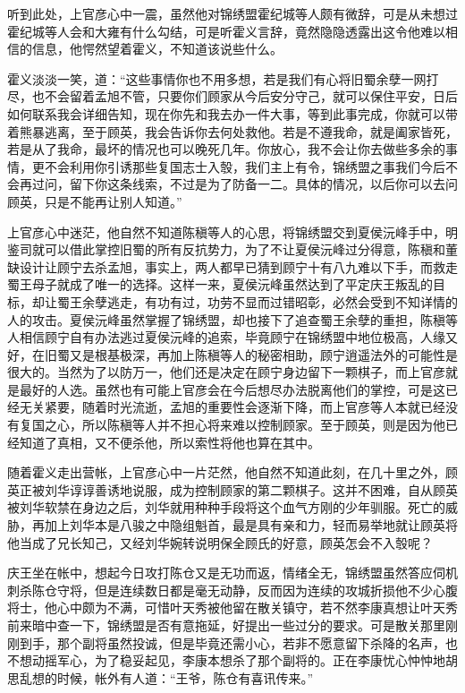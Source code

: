 听到此处，上官彦心中一震，虽然他对锦绣盟霍纪城等人颇有微辞，可是从未想过霍纪城等人会和大雍有什么勾结，可是听霍义言辞，竟然隐隐透露出这令他难以相信的信息，他愕然望着霍义，不知道该说些什么。

霍义淡淡一笑，道：“这些事情你也不用多想，若是我们有心将旧蜀余孽一网打尽，也不会留着孟旭不管，只要你们顾家从今后安分守己，就可以保住平安，日后如何联系我会详细告知，现在你先和我去办一件大事，等到此事完成，你就可以带着熊暴逃离，至于顾英，我会告诉你去何处救他。若是不遵我命，就是阖家皆死，若是从了我命，最坏的情况也可以晚死几年。你放心，我不会让你去做些多余的事情，更不会利用你引诱那些复国志士入彀，我们主上有令，锦绣盟之事我们今后不会再过问，留下你这条线索，不过是为了防备一二。具体的情况，以后你可以去问顾英，只是不能再让别人知道。”

上官彦心中迷茫，他自然不知道陈稹等人的心思，将锦绣盟交到夏侯沅峰手中，明鉴司就可以借此掌控旧蜀的所有反抗势力，为了不让夏侯沅峰过分得意，陈稹和董缺设计让顾宁去杀孟旭，事实上，两人都早已猜到顾宁十有八九难以下手，而救走蜀王母子就成了唯一的选择。这样一来，夏侯沅峰虽然达到了平定庆王叛乱的目标，却让蜀王余孽逃走，有功有过，功劳不显而过错昭彰，必然会受到不知详情的人的攻击。夏侯沅峰虽然掌握了锦绣盟，却也接下了追查蜀王余孽的重担，陈稹等人相信顾宁自有办法逃过夏侯沅峰的追索，毕竟顾宁在锦绣盟中地位极高，人缘又好，在旧蜀又是根基极深，再加上陈稹等人的秘密相助，顾宁逍遥法外的可能性是很大的。当然为了以防万一，他们还是决定在顾宁身边留下一颗棋子，而上官彦就是最好的人选。虽然也有可能上官彦会在今后想尽办法脱离他们的掌控，可是这已经无关紧要，随着时光流逝，孟旭的重要性会逐渐下降，而上官彦等人本就已经没有复国之心，所以陈稹等人并不担心将来难以控制顾家。至于顾英，则是因为他已经知道了真相，又不便杀他，所以索性将他也算在其中。

随着霍义走出营帐，上官彦心中一片茫然，他自然不知道此刻，在几十里之外，顾英正被刘华谆谆善诱地说服，成为控制顾家的第二颗棋子。这并不困难，自从顾英被刘华软禁在身边之后，刘华就用种种手段将这个血气方刚的少年驯服。死亡的威胁，再加上刘华本是八骏之中隐组魁首，最是具有亲和力，轻而易举地就让顾英将他当成了兄长知己，又经刘华婉转说明保全顾氏的好意，顾英怎会不入彀呢？

庆王坐在帐中，想起今日攻打陈仓又是无功而返，情绪全无，锦绣盟虽然答应伺机刺杀陈仓守将，但是连续数日都是毫无动静，反而因为连续的攻城折损他不少心腹将士，他心中颇为不满，可惜叶天秀被他留在散关镇守，若不然李康真想让叶天秀前来暗中查一下，锦绣盟是否有意拖延，好提出一些过分的要求。可是散关那里刚刚到手，那个副将虽然投诚，但是毕竟还需小心，若非不愿意留下杀降的名声，也不想动摇军心，为了稳妥起见，李康本想杀了那个副将的。正在李康忧心忡忡地胡思乱想的时候，帐外有人道：“王爷，陈仓有喜讯传来。”

